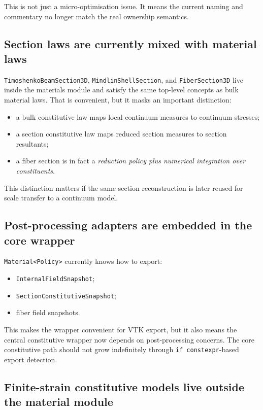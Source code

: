 This is not just a micro-optimisation issue.  It means the current naming and
commentary no longer match the real ownership semantics.

\subsection{Section laws are currently mixed with material laws}

\texttt{TimoshenkoBeamSection3D}, \texttt{MindlinShellSection}, and
\texttt{FiberSection3D} live inside the materials module and satisfy the same
top-level concepts as bulk material laws.  That is convenient, but it masks an
important distinction:
\begin{itemize}
  \item a bulk constitutive law maps local continuum measures to continuum
        stresses;
  \item a section constitutive law maps reduced section measures to section
        resultants;
  \item a fiber section is in fact a \emph{reduction policy plus numerical
        integration over constituents}.
\end{itemize}

This distinction matters if the same section reconstruction is later reused for
scale transfer to a continuum model.

\subsection{Post-processing adapters are embedded in the core wrapper}

\texttt{Material<Policy>} currently knows how to export:
\begin{itemize}
  \item \texttt{InternalFieldSnapshot};
  \item \texttt{SectionConstitutiveSnapshot};
  \item fiber field snapshots.
\end{itemize}

This makes the wrapper convenient for VTK export, but it also means the
central constitutive wrapper now depends on post-processing concerns.  The
core constitutive path should not grow indefinitely through
\texttt{if constexpr}-based export detection.

\subsection{Finite-strain constitutive models live outside the material module}

